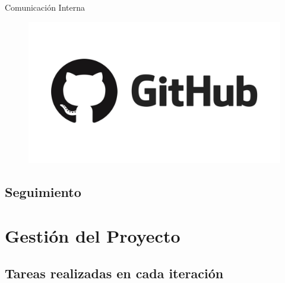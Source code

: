 \documentclass{beamer}
\begin{document}
\begin{frame}{Comunicaci\'on Interna}
\begin{figure}[H]
	\hspace{0.7cm}
	\includegraphics[width=0.35\paperwidth, height=0.4\paperheight]{images_latex/github}
	\end{figure}

\end{frame}

\subsection{Seguimiento}

\section{Gesti\'on del Proyecto}

\subsection{Tareas realizadas en cada iteraci\'on}
\end{document}
